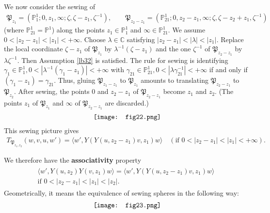 \documentclass[11pt,b5paper,notitlepage]{article}
\theoremstyle{definition}
\theoremstyle{plain}
\newcommand{\fk}{\mathfrak}
\newcommand{\bk}[1]{\langle {#1}\rangle}
\newcommand{\Cbb}{\mathbb C}
\newcommand{\Pbb}{\mathbb P}
\numberwithin{equation}{section}
\begin{document}
\subsection{}\label{lb186}
We now consider the sewing of
\begin{gather*}
	\fk P_{z_1}=(\Pbb^1_1;0,z_1,\infty;\zeta,\zeta-z_1,\zeta^{-1}),\qquad \fk P_{z_2-z_1}=(\Pbb^1_{21};0,z_2-z_1,\infty;\zeta,\zeta-z_2+z_1,\zeta^{-1})	
\end{gather*}
(where $\Pbb^1_{21}=\Pbb^1$) along the points $z_1\in\Pbb^1_1$ and $\infty\in\Pbb^1_{21}$. We assume $0<|z_2-z_1|<|z_1|<+\infty$. Choose $\lambda\in\Cbb$ satisfying $|z_2-z_1|<|\lambda|<|z_1|$.  Replace the local coordinate $\zeta-z_1$ of $\fk P_{z_1}$ by $\lambda^{-1}(\zeta-z_1)$ and the one $\zeta^{-1}$ of $\fk P_{z_2-z_1}$ by $\lambda \zeta^{-1}$. Then Assumption \ref{lb32} is satisfied. The rule for sewing is identifying $\gamma_1\in \Pbb^1_1,0<|\lambda^{-1}(\gamma_1-z_1)|<+\infty$ with $\gamma_{21}\in\Pbb^1_{21},0<|\lambda\gamma_{21}^{-1}|<+\infty$ if and only if $(\gamma_1-z_1)=\gamma_{21}$. Thus, gluing $\fk P_{z_1-z_1}$ to $\fk P_{z_1}$ amounts to translating $\fk P_{z_2-z_1}$ to $\fk P_{z_2}$. After sewing, the points $0$ and $z_2-z_1$ of $\fk P_{z_2-z_1}$ become $z_1$ and $z_2$. (The points $z_1$ of $\fk P_{z_1}$ and $\infty$ of $\fk P_{z_2-z_1}$ are discarded.) 
\begin{align*}
	\vcenter{\hbox{{
				\texttt{[image: fig22.png]}}}}
\end{align*}
This sewing picture gives
\begin{align}
T_{\fk P_{z_1,z_2}}(w,v,u,w')=\bk{w',Y(Y(u,z_2-z_1)v,z_1)w}\quad(\text{if }0<|z_2-z_1|<|z_1|<+\infty).\label{eq45}	
\end{align}

We therefore have the \textbf{associativity} property
\begin{gather}\label{eq60}
\begin{gathered}
\bk{w',Y(u,z_2)Y(v,z_1)w}=\bk{w',Y(Y(u,z_2-z_1)v,z_1)w}\\
\text{if }0<|z_2-z_1|<|z_1|<|z_2|.
\end{gathered}	
\end{gather}
Geometrically, it means the equivalence of sewing spheres in the following way:
\begin{align*}
	\vcenter{\hbox{{
				\texttt{[image: fig23.png]}}}}
\end{align*}

\subsection{}\label{lb38}
\end{document}
